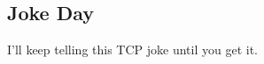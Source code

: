 \documentclass[xga]{xdvislides}
\begin{document}
%
%
%
%
%

\subsection{Joke Day}
\vspace*{\fill}
\begin{center}
\Huge
I'll keep telling this TCP joke until you get it.
\Normalsize
\end{center}
\vspace*{\fill}
\end{document}
